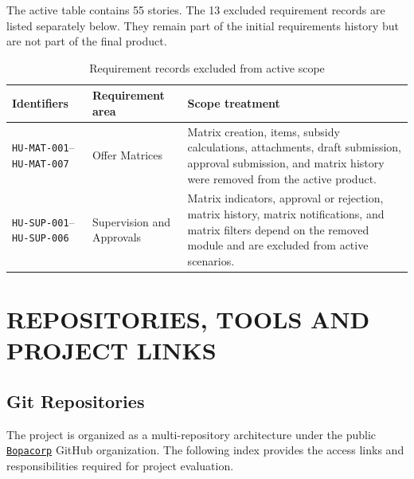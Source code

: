 \documentclass[letterpaper%
, oneside%
, 12pt%
, memoireprojet%
, english%
,creativecommons,hyperref, withAlgo2e %
]{thETS}
\begin{document}
The active table contains 55 stories. The 13 excluded requirement records are listed separately
below. They remain part of the initial requirements history but are not part of the final product.

\begin{table}[H]
\centering
\small
\caption{Requirement records excluded from active scope}
\label{tab:excluded_user_stories}
\begin{tabular}{|L{2.8cm}|L{4.0cm}|L{8.0cm}|}
\hline
\textbf{Identifiers} & \textbf{Requirement area} & \textbf{Scope treatment} \\
\hline
\texttt{HU-MAT-001}--\texttt{HU-MAT-007} & Offer Matrices & Matrix creation, items, subsidy calculations, attachments, draft submission, approval submission, and matrix history were removed from the active product. \\
\hline
\texttt{HU-SUP-001}--\texttt{HU-SUP-006} & Supervision and Approvals & Matrix indicators, approval or rejection, matrix history, matrix notifications, and matrix filters depend on the removed module and are excluded from active scenarios. \\
\hline
\end{tabular}
\end{table}

\chapter{REPOSITORIES, TOOLS AND PROJECT LINKS}
\label{app:project_links}

\section{Git Repositories}
The project is organized as a multi-repository architecture under the public
\href{https://github.com/Bopacorp}{\texttt{Bopacorp}} GitHub organization. The following index
provides the access links and responsibilities required for project evaluation.
\end{document}
